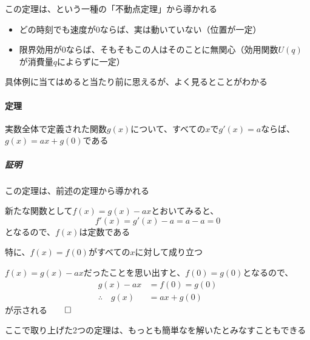 \documentclass[../book_jiriki_calc]{subfiles}
\begin{document}
この定理は、という一種の「不動点定理」から導かれる

\begin{itemize}
  \item どの時刻でも速度が$0$ならば、実は動いていない（位置が一定）
  \item 限界効用が$0$ならば、そもそもこの人はそのことに無関心（効用関数$U(q)$が消費量$q$によらずに一定）
\end{itemize}

具体例に当てはめると当たり前に思えるが、よく見るとことがわかる

\sectionline

\paragraph{定理}

実数全体で定義された関数$g(x)$について、すべての$x$で$g'(x)=a$ならば、$g(x) = ax+g(0)$である

\sectionline

\subparagraph{証明}

この定理は、前述の定理から導かれる

新たな関数として$f(x) = g(x) - ax$とおいてみると、
\begin{equation}
  f'(x) = g'(x) - a = a - a = 0
\end{equation}
となるので、$f(x)$は定数である

特に、$f(x) = f(0)$がすべての$x$に対して成り立つ

\br

$f(x) = g(x) - ax$だったことを思い出すと、$f(0)= g(0)$となるので、
\begin{align}
  g(x) -ax              & =f(0) = g(0) \\
  \therefore \quad g(x) & = ax + g(0)
\end{align}
が示される$\qed$

\sectionline

ここで取り上げた2つの定理は、もっとも簡単なを解いたとみなすこともできる
\end{document}

